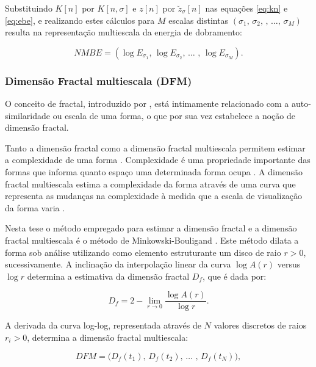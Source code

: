 Substituindo $K[n]$ por $K[n,\sigma]$ e $z[n]$ por $\breve{z}_{\sigma}[n]$ nas equações \ref{eq:kn} e \ref{eq:ebe}, e realizando estes cálculos para $M$ escalas distintas $(\sigma_1\text{, }\sigma_2\text{, }\text{, }\ldots\text{, }\sigma_M)$ resulta na representação multiescala da energia de dobramento:

\begin{equation}
NMBE = (\log{E_{\sigma_{1}}}\text{, }\log{E_{\sigma_{2}}}\text{, }\ldots \text{ , }\log{E_{\sigma_{M}}}).
\label{eq:nmbe}
\end{equation}

\subsubsection{Dimensão Fractal multiescala (DFM)}

O conceito de fractal, introduzido por , está intimamente relacionado com a auto-similaridade ou escala de uma forma, o que por sua vez estabelece a noção de dimensão fractal.

Tanto a dimensão fractal como a dimensão fractal multiescala permitem estimar a complexidade de uma forma \cite{Backes:2012}. Complexidade é uma propriedade importante das formas que informa quanto espaço uma determinada forma ocupa \cite{Costa:2009}. A dimensão fractal multiescala estima a complexidade da forma através de uma curva que representa as mudanças na complexidade à medida que a escala de visualização da forma varia \cite{Florindo:2012}.

Nesta tese o método empregado para estimar a dimensão fractal e a dimensão fractal multiescala é o método de Minkowski-Bouligand \cite{Costa:2009}. Este método dilata a forma sob análise utilizando como elemento estruturante um disco de raio $r > 0$, sucessivamente. A inclinação da interpolação linear da curva $\log{A(r)}$ versus $\log{r}$ determina a estimativa da dimensão fractal $D_f$, que é dada por:

\begin{equation}
D_f = 2 - \lim_{r \to 0}  \frac{\log{A(r)}}{\log{r}}.
\label{eq:df}
\end{equation}

A derivada da curva log-log, representada através de $N$ valores discretos de raios $r_i>0$, determina a dimensão fractal multiescala:

\begin{equation}
DFM = \big(D_f(t_1)\text{, }D_f(t_2)\text{, }\ldots\text{ , }D_f(t_N)\big), 
\label{eq:dfm}
\end{equation}

